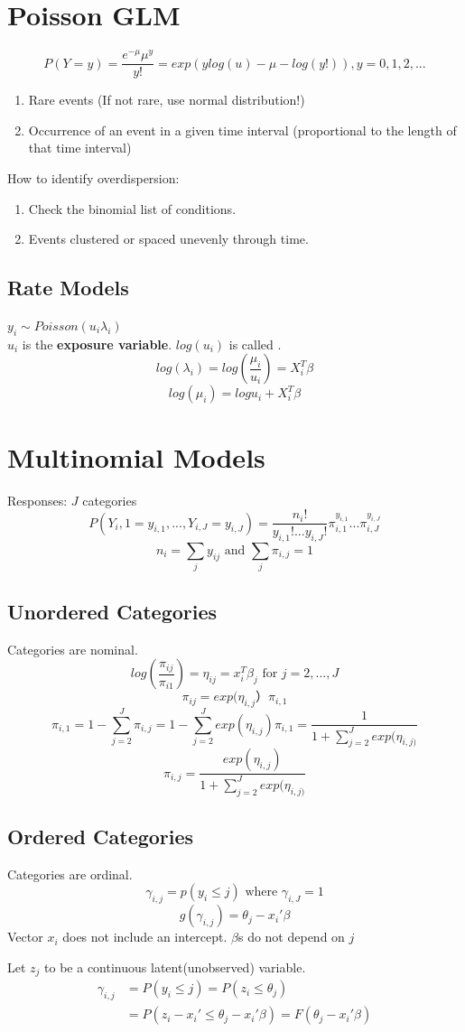 \documentclass[10pt,landscape, fleqn]{article}
\begin{document}
\begin{multicols}{3}
		\section{Poisson GLM}
			\[ P(Y=y) = \frac{e^{-\mu}\mu^y}{y!} = exp(ylog(u)-\mu-log(y!)), y=0,1,2,... \]
			\begin{enumerate}
				\item Rare events (If not rare, use normal distribution!)
				\item Occurrence of an event in a given time interval (proportional to the length of that time interval)
			\end{enumerate}
			How to identify overdispersion:
			\begin{enumerate}
				\item Check the binomial list of conditions.
				\item Events clustered or spaced unevenly through time.
			\end{enumerate}
			\subsection{Rate Models}
				$ y_i \sim Poisson(u_i\lambda_i) $ \\
				$u_i$ is the \textbf{exposure variable}. $log(u_i)$ is called .
				\[ log(\lambda_i) = log\left(\frac{\mu_i}{u_i}\right) = X_i^T\beta \]
				\[ log(\mu_i) = log u_i + X_i^T\beta \]
					
		\section{Multinomial Models}
			Responses: $J$ categories 
			\[ P(Y_i,1 = y_{i,1},...,Y_{i,J}=y_{i,J}) = \frac{n_i!}{y_{i,1}!...y_{i,J}!}\pi_{i,1}^{y_{i,1}}...\pi_{i,J}^{y_{i,J}}  \]
			\[ n_i = \sum_{j}y_{ij} \mbox{ and } \sum_{j}\pi_{i,j}=1 \]
			\subsection{Unordered Categories}
				Categories are nominal.
				\[ log\left(\frac{\pi_{ij}}{\pi_{i1}}\right) =\eta_{ij} = x_i^T\beta_j \mbox{ for } j=2,...,J \]
				\[ \pi_{ij} = exp(\eta_{i,j}） \pi_{i,1} \]
				\[ \pi_{i,1} = 1 - \sum_{j=2}^{J}\pi_{i,j} = 1 - \sum_{j=2}^{J}exp(\eta_{i,j})\pi_{i,1} = \frac{1}{1+\sum_{j=2}^{J}exp(\eta_{i,j)}} \]
				\[ \pi_{i,j} = \frac{exp(\eta_{i,j})}{1+\sum_{j=2}^{J}exp(\eta_{i,j)}} \]
			\subsection{Ordered Categories}
				Categories are ordinal.
				\[ \gamma_{i,j} = p(y_i\leq j) \mbox{ where } \gamma_{i,J} = 1 \]
				\[ g(\gamma_{i,j}) = \theta_j - x_i'\beta \]
				Vector $x_i$ does not include an intercept. $\beta$s do not depend on $j$ \par 
				Let $z_j$ to be a continuous latent(unobserved) variable. 
				\[ 
					\begin{split}
						\gamma_{i,j} &= P(y_i\leq j) = P(z_i\leq \theta_j) \\
						             &= P(z_i-x_i' \leq \theta_{j} - x_i'\beta) =  F(\theta_j-x_i'\beta)
					\end{split}
				\]

\end{multicols}
\end{document}
